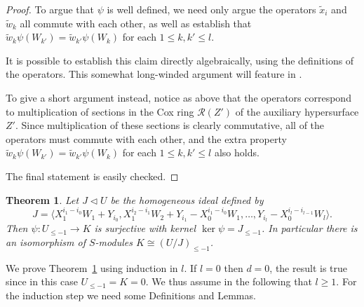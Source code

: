 \documentclass[a4paper,11pt]{amsart}
\theoremstyle{plain}
\newtheorem{theorem}{Theorem}[section]
\theoremstyle{definition}
\newcommand{\R}{\mathcal{R}}
\begin{document}
\begin{proof}
    To argue that $\psi$ is well defined, we need only argue the operators $\tilde x_i$ and $\tilde w_k$ all commute with each other, as well as establish that $\tilde w_k \psi(W_{k'}) = \tilde w_{k'} \psi(W_k)$ for each $1 \leq k, k' \leq l$. 

    It is possible to establish this claim directly algebraically, using the definitions of the operators. 
    This somewhat long-winded argument will feature in \cite{pollock}.

    To give a short argument instead, notice as above that the operators correspond to multiplication of sections in the Cox ring $\R(Z')$ of the auxiliary hypersurface $Z'$. Since multiplication of these sections is clearly commutative, all of the operators must commute with each other, and the extra property
    $\tilde w_k \psi(W_{k'}) = \tilde w_{k'} \psi(W_k)$ for each $1 \leq k, k' \leq l$ also holds.

    The final statement is easily checked.
\end{proof}

\begin{theorem}\label{thm:generalgebra}
    Let $J \lhd U$ be the homogeneous ideal defined by
    \begin{equation*}
       J = \langle X_1^{i_1 - i_0} W_1 +Y_{i_0}, X_1^{i_2 - i_1} W_2 + Y_{i_1} - X_0^{i_1 - i_0} W_1,  \dots , Y_{i_l} - X_0^{i_l - i_{l-1}} W_l\rangle. 
   \end{equation*}
    Then $\psi:U_{\leq -1} \rightarrow K$ is surjective with kernel $\ker \psi = J_{\leq -1}$. In particular there is an isomorphism of $S$-modules $K \cong (U/J)_{ \leq -1}$.
\end{theorem}

We prove Theorem~\ref{thm:generalgebra} using induction in $l$. If $l = 0$ then $d = 0$, the result is true since in this case $U_{ \leq -1} = K = 0$. We thus assume in the following that $l \geq 1$. For the induction step we need some Definitions and Lemmas.
\end{document}

